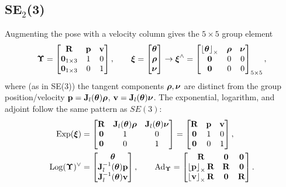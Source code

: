 \subsection{SE\texorpdfstring{$_2$}{2}(3)}
Augmenting the pose with a velocity column gives the $5\times5$ group element
\begin{align}
\vect{\Upsilon} = \begin{bmatrix} \vect{R} & \vect{p} & \vect{v} \\ \vect{0}_{1\times3} & 1 & 0 \\ \vect{0}_{1\times3} & 0 & 1 \end{bmatrix}, \qquad
\vect{\xi} = \begin{bmatrix}\vect{\theta}\\\vect{\rho}\\\vect{\nu}\end{bmatrix} \to \vect{\xi}^{\wedge} = \begin{bmatrix}\skewsym{\vect{\theta}} & \vect{\rho} & \vect{\nu} \\ \vect{0} & 0 & 0 \\ \vect{0} & 0 & 0\end{bmatrix}_{5\times5},
\end{align}
where (as in SE(3)) the tangent components $\vect{\rho},\vect{\nu}$ are distinct from the group position/velocity $\vect{p} = \vect{J}_l(\vect{\theta})\vect{\rho}$, $\vect{v} = \vect{J}_l(\vect{\theta})\vect{\nu}$. The exponential, logarithm, and adjoint follow the same pattern as $SE(3)$:
\begin{align}
\Exp(\vect{\xi}) &= \begin{bmatrix} \vect{R} & \vect{J}_l(\vect{\theta})\vect{\rho} & \vect{J}_l(\vect{\theta})\vect{\nu} \\ \vect{0} & 1 & 0 \\ \vect{0} & 0 & 1\end{bmatrix} = \begin{bmatrix}\vect{R} & \vect{p} & \vect{v}\\ \vect{0} & 1 & 0\\ \vect{0} & 0 & 1\end{bmatrix}, \\
\Log(\vect{\Upsilon})^{\vee} &= \begin{bmatrix}\vect{\theta}\\ \vect{J}_l^{-1}(\vect{\theta})\vect{p}\\ \vect{J}_l^{-1}(\vect{\theta})\vect{v}\end{bmatrix}, \qquad
\Ad_{\vect{\Upsilon}} = \begin{bmatrix}\vect{R} & \vect{0} & \vect{0}\\ \skewsym{\vect{p}}\vect{R} & \vect{R} & \vect{0}\\ \skewsym{\vect{v}}\vect{R} & \vect{0} & \vect{R}\end{bmatrix}.
\end{align}

